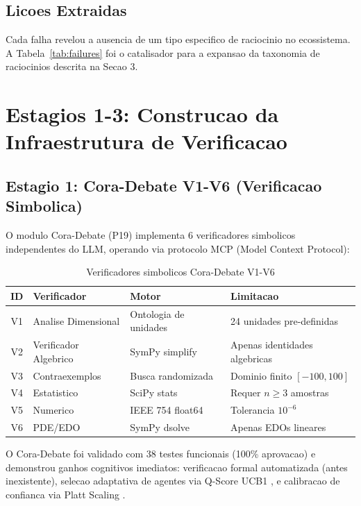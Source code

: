 \documentclass[5p]{elsarticle}
\begin{document}
\subsection{Licoes Extraidas}

Cada falha revelou a ausencia de um tipo especifico de raciocinio no ecossistema.
A Tabela~\ref{tab:failures} foi o catalisador para a expansao da taxonomia de
raciocinios descrita na Secao 3.

\section{Estagios 1-3: Construcao da Infraestrutura de Verificacao}

\subsection{Estagio 1: Cora-Debate V1-V6 (Verificacao Simbolica)}

O modulo Cora-Debate (P19) \cite{cora2026} implementa 6 verificadores simbolicos
independentes do LLM, operando via protocolo MCP (Model Context Protocol):

\begin{table}[H]
  \centering
  \caption{Verificadores simbolicos Cora-Debate V1-V6}
  \label{tab:cora}
  \begin{tabular}{clll}
    \toprule
    \textbf{ID} & \textbf{Verificador} & \textbf{Motor} & \textbf{Limitacao} \\
    \midrule
    V1 & Analise Dimensional & Ontologia de unidades & 24 unidades pre-definidas \\
    V2 & Verificador Algebrico & SymPy simplify \cite{meurer2017} & Apenas identidades algebricas \\
    V3 & Contraexemplos & Busca randomizada & Dominio finito $[-100,100]$ \\
    V4 & Estatistico & SciPy stats \cite{virtanen2020} & Requer $n\geq 3$ amostras \\
    V5 & Numerico & IEEE 754 float64 & Tolerancia $10^{-6}$ \\
    V6 & PDE/EDO & SymPy dsolve & Apenas EDOs lineares \\
    \bottomrule
  \end{tabular}
\end{table}

O Cora-Debate foi validado com 38 testes funcionais (100\% aprovacao) e demonstrou
ganhos cognitivos imediatos: verificacao formal automatizada (antes inexistente),
selecao adaptativa de agentes via Q-Score UCB1 \cite{auer2002}, e calibracao de
confianca via Platt Scaling \cite{platt1999,guo2017}.
\end{document}
